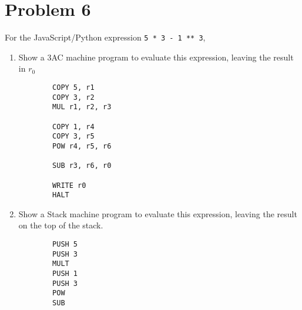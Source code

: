 \documentclass{article}
\begin{document}
\section*{Problem 6}
For the JavaScript/Python expression \verb|5 * 3 - 1 ** 3|,
\begin{enumerate}[label=(\alph*)]
  \item Show a 3AC machine program to evaluate this expression, leaving the result in $r_0$
    \begin{shaded}
      \begin{verbatim}
        COPY 5, r1
        COPY 3, r2
        MUL r1, r2, r3

        COPY 1, r4
        COPY 3, r5
        POW r4, r5, r6

        SUB r3, r6, r0

        WRITE r0
        HALT
      \end{verbatim}
    \end{shaded}

  \item Show a Stack machine program to evaluate this expression, leaving the result on the top of the stack.
    \begin{shaded}
      \begin{verbatim}
        PUSH 5
        PUSH 3
        MULT
        PUSH 1
        PUSH 3
        POW
        SUB
      \end{verbatim}
    \end{shaded}
\end{enumerate}
\end{document}
